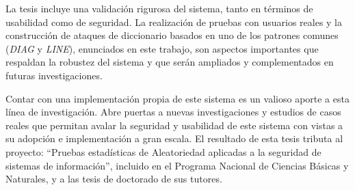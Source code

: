 \begin{opinion}
   La tesis incluye una validación rigurosa del sistema, tanto en términos de usabilidad como de seguridad. La realización de pruebas con usuarios reales y la construcción de ataques de diccionario basados en uno de los patrones comunes (\textit{DIAG} y \textit{LINE}), enunciados en este trabajo, son aspectos importantes que respaldan la robustez del sistema y que serán ampliados y complementados en futuras investigaciones.
   
   Contar con una implementación propia de este sistema es un valioso aporte a esta línea de investigación. Abre puertas a nuevas investigaciones y estudios de casos reales que permitan avalar la seguridad y usabilidad de este sistema con vistas a su adopción e implementación a gran escala. El resultado de esta tesis tributa al proyecto: “Pruebas estadísticas de Aleatoriedad aplicadas a la seguridad de sistemas de información”, incluido en el Programa Nacional de Ciencias Básicas y Naturales, y a las tesis de doctorado de sus tutores.
   
\end{opinion}